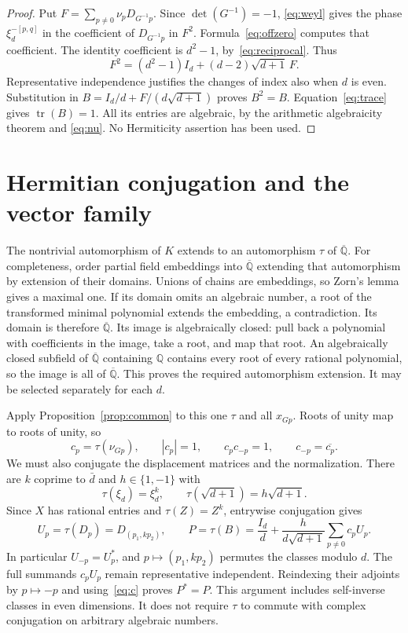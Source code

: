 \documentclass[11pt]{article}
\newcommand{\Q}{\mathbb Q}
\newcommand{\Qbar}{\overline{\mathbb Q}}
\newcommand{\tr}{\operatorname{tr}}
\begin{document}
\begin{proof}
Put $F=\sum_{p\ne0}\nu_pD_{G^{-1}p}$. Since $\det(G^{-1})=-1$,
\eqref{eq:weyl} gives the phase $\xi_d^{-[p,q]}$ in the coefficient of
$D_{G^{-1}p}$ in $F^2$. Formula~\eqref{eq:offzero} computes that
coefficient. The identity coefficient is $d^2-1$, by~\eqref{eq:reciprocal}.
Thus
\begin{equation}
\label{eq:F}
 F^2=(d^2-1)I_d+(d-2)\sqrt{d+1}\,F.
\end{equation}
Representative independence justifies the changes of index also when $d$ is
even. Substitution in $B=I_d/d+F/(d\sqrt{d+1})$ proves $B^2=B$.
Equation~\eqref{eq:trace} gives $\tr(B)=1$.
All its entries are algebraic, by the arithmetic algebraicity theorem and
\eqref{eq:nu}. No Hermiticity assertion has been used.
\end{proof}

\section{Hermitian conjugation and the vector family}
\label{sec:hermitian}

The nontrivial automorphism of $K$ extends to an automorphism $\tau$ of
$\Qbar$. For completeness, order partial field embeddings into $\Qbar$
extending that automorphism by extension of their domains. Unions of chains
are embeddings, so Zorn's lemma gives a maximal one. If its domain omits an
algebraic number, a root of the transformed minimal polynomial extends the
embedding, a contradiction. Its domain is therefore $\Qbar$. Its image is
algebraically closed: pull back a polynomial with coefficients in the image,
take a root, and map that root. An algebraically closed subfield of $\Qbar$
containing $\Q$ contains every root of every rational polynomial, so the
image is all of $\Qbar$. This proves the required automorphism extension.
It may be selected separately for each $d$.

Apply Proposition~\ref{prop:common} to this one $\tau$ and all $x_{Gp}$.
Roots of unity map to roots of unity, so
\begin{equation}
\label{eq:c}
 c_p=\tau(\nu_{Gp}),\qquad |c_p|=1,\qquad
 c_pc_{-p}=1,\qquad c_{-p}=\overline{c_p}.
\end{equation}
We must also conjugate the displacement matrices and the normalization.
There are $k$ coprime to $\bar d$ and $h\in\{1,-1\}$ with
\[
 \tau(\xi_d)=\xi_d^k,\qquad
 \tau(\sqrt{d+1})=h\sqrt{d+1}.
\]
Since $X$ has rational entries and $\tau(Z)=Z^k$, entrywise conjugation gives
\begin{equation}
\label{eq:P}
 U_p=\tau(D_p)=D_{(p_1,kp_2)},\qquad
 P=\tau(B)=\frac{I_d}{d}+\frac{h}{d\sqrt{d+1}}
           \sum_{p\ne0}c_pU_p.
\end{equation}
In particular $U_{-p}=U_p^*$, and $p\mapsto(p_1,kp_2)$ permutes the
classes modulo $d$. The full summands $c_pU_p$ remain representative
independent. Reindexing their adjoints by $p\mapsto-p$ and
using~\eqref{eq:c} proves $P^*=P$. This argument includes self-inverse
classes in even dimensions. It does not require $\tau$ to commute with
complex conjugation on arbitrary algebraic numbers.
\end{document}
